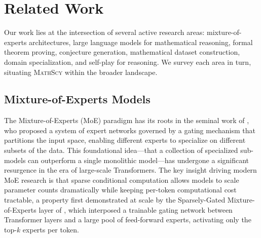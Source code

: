 \documentclass[11pt,a4paper]{article}
\newcommand{\mathscy}{\textsc{MathScy}}
\begin{document}
\section{Related Work}
\label{sec:related_work}

Our work lies at the intersection of several active research areas: mixture-of-experts architectures, large language models for mathematical reasoning, formal theorem proving, conjecture generation, mathematical dataset construction, domain specialization, and self-play for reasoning. We survey each area in turn, situating \mathscy{} within the broader landscape.

\subsection{Mixture-of-Experts Models}

The Mixture-of-Experts (MoE) paradigm has its roots in the seminal work of \cite{jacobs1991adaptive}, who proposed a system of expert networks governed by a gating mechanism that partitions the input space, enabling different experts to specialize on different subsets of the data. This foundational idea---that a collection of specialized sub-models can outperform a single monolithic model---has undergone a significant resurgence in the era of large-scale Transformers. The key insight driving modern MoE research is that sparse conditional computation allows models to scale parameter counts dramatically while keeping per-token computational cost tractable, a property first demonstrated at scale by the Sparsely-Gated Mixture-of-Experts layer of \cite{shazeer2017outrageously}, which interposed a trainable gating network between Transformer layers and a large pool of feed-forward experts, activating only the top-$k$ experts per token.
\end{document}
